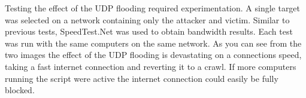 Testing the effect of the UDP flooding required experimentation. A single target was selected on a network containing only the attacker and victim. Similar to previous tests, SpeedTest.Net was used to obtain bandwidth results. Each test was run with the same computers on the same network. As you can see from the two images the effect of the UDP flooding is devastating on a connections speed, taking a fast internet connection and reverting it to a crawl. If more computers running the script were active the internet connection could easily be fully blocked.